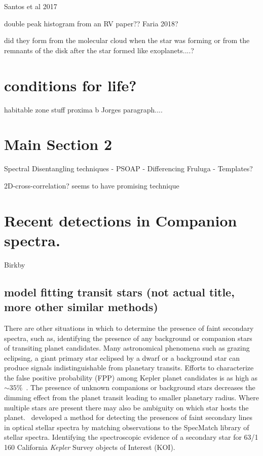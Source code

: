 Santos et al 2017 


double peak histogram from an {RV} paper?? Faria 2018?


did they form from the molecular cloud when the star was forming or from the remnants of the disk after the star formed like exoplanets....?


\section{ conditions for life?}
habitable zone stuff
proxima b
Jorges paragraph.... 

\section{Main Section 2}


Spectral Disentangling techniques
- PSOAP
- Differencing Fruluga
- Templates?


2D-cross-correlation?   \citet{piskorz_evidence_2016} seems to have promising technique


\section{Recent detections in Companion spectra.}

Birkby


\subsection{model fitting transit stars (not actual title, more other similar methods)}
There are other situations in which to determine the presence of faint secondary spectra, such as, identifying the presence of any background or companion stars of transiting planet candidates. 
Many astronomical phenomena such as grazing eclipsing, a giant primary star eclipsed by a dwarf or a background star can produce signals indistinguishable from planetary transits. 
Efforts to characterize the false positive probability (FPP) among Kepler planet candidates is as high as $\sim35\%$~\citep{santerne_sophie_2012}.
The presence of unknown companions or background stars decreases the dimming effect from the planet transit leading to smaller planetary radius. 
Where multiple stars are present there may also be ambiguity on which star hosts the planet.~\citet{kolbl_detection_2015} developed a method for detecting the presences of faint secondary lines in optical stellar spectra by matching observations to the SpecMatch library of stellar spectra.
Identifying the spectroscopic evidence of a secondary star for 63/1\,160 California \emph{Kepler} Survey objects of Interest (KOI).


